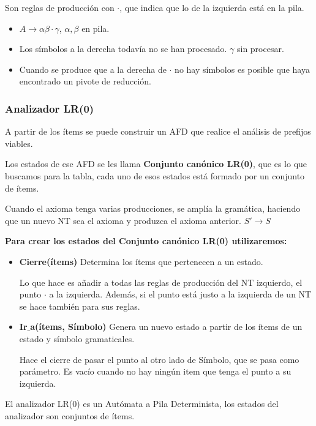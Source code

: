 \documentclass[12pt, twoside, openright]{report} %
\begin{document}
Son reglas de producción con $\cdot$, que indica que lo de la izquierda está en la pila.
\begin{itemize}
  \item $A \rightarrow \alpha \beta \cdot \gamma$, $\alpha,\beta$ en pila.
  \item Los símbolos a la derecha todavía no se han procesado. $\gamma$ sin procesar.
  \item Cuando se produce que a la derecha de $\cdot$ no hay símbolos es posible que haya encontrado un pivote de reducción.
\end{itemize}

\subsubsection{Analizador LR(0)}
A partir de los ítems se puede construir un AFD que realice el análisis de prefijos viables.

Los estados de ese AFD se les llama \textbf{Conjunto canónico LR(0)}, que es lo que buscamos para la tabla, cada uno de esos estados está formado por un conjunto de ítems.

Cuando el axioma tenga varias producciones, se amplía la gramática, haciendo que un nuevo NT sea el axioma y produzca el axioma anterior. $S'\rightarrow S$

\textbf{Para crear los estados del Conjunto canónico LR(0) utilizaremos:}
\begin{itemize}
  \item \textbf{Cierre(ítems)} Determina los ítems que pertenecen a un estado. 
  
  Lo que hace es añadir a todas las reglas de producción del NT izquierdo, el punto $\cdot$ a la izquierda. Además, si el punto está justo a la izquierda de un NT se hace también para sus reglas. 
  
  \item \textbf{Ir$\_$a(ítems, Símbolo)} Genera un nuevo estado a partir de los ítems de un estado y símbolo gramaticales.
  
  Hace el cierre de pasar el punto al otro lado de Símbolo, que se pasa como parámetro. Es vacío cuando no hay ningún item que tenga el punto a su izquierda.
\end{itemize}

El analizador LR(0) es un Autómata a Pila Determinista, los estados del analizador son conjuntos de ítems.
\end{document}
